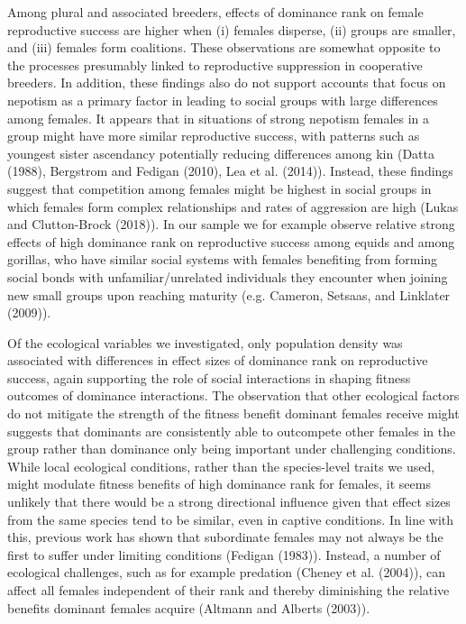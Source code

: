 \documentclass[
]{article}
\begin{document}
Among plural and associated breeders, effects of dominance rank on
female reproductive success are higher when (i) females disperse, (ii)
groups are smaller, and (iii) females form coalitions. These
observations are somewhat opposite to the processes presumably linked to
reproductive suppression in cooperative breeders. In addition, these
findings also do not support accounts that focus on nepotism as a
primary factor in leading to social groups with large differences among
females. It appears that in situations of strong nepotism females in a
group might have more similar reproductive success, with patterns such
as youngest sister ascendancy potentially reducing differences among kin
(Datta (1988), Bergstrom and Fedigan (2010), Lea et al. (2014)).
Instead, these findings suggest that competition among females might be
highest in social groups in which females form complex relationships and
rates of aggression are high (Lukas and Clutton-Brock (2018)). In our
sample we for example observe relative strong effects of high dominance
rank on reproductive success among equids and among gorillas, who have
similar social systems with females benefiting from forming social bonds
with unfamiliar/unrelated individuals they encounter when joining new
small groups upon reaching maturity (e.g. Cameron, Setsaas, and
Linklater (2009)).

Of the ecological variables we investigated, only population density was
associated with differences in effect sizes of dominance rank on
reproductive success, again supporting the role of social interactions
in shaping fitness outcomes of dominance interactions. The observation
that other ecological factors do not mitigate the strength of the
fitness benefit dominant females receive might suggests that dominants
are consistently able to outcompete other females in the group rather
than dominance only being important under challenging conditions. While
local ecological conditions, rather than the species-level traits we
used, might modulate fitness benefits of high dominance rank for
females, it seems unlikely that there would be a strong directional
influence given that effect sizes from the same species tend to be
similar, even in captive conditions. In line with this, previous work
has shown that subordinate females may not always be the first to suffer
under limiting conditions (Fedigan (1983)). Instead, a number of
ecological challenges, such as for example predation (Cheney et al.
(2004)), can affect all females independent of their rank and thereby
diminishing the relative benefits dominant females acquire (Altmann and
Alberts (2003)).
\end{document}
